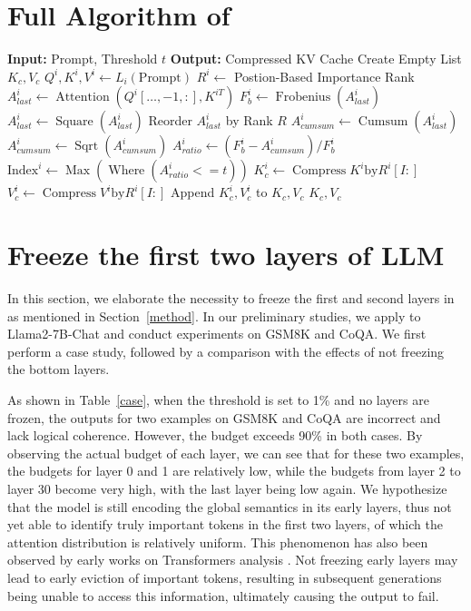 \section{Full Algorithm of \method}

\begin{algorithm}
\caption{\method \label{al}}
\begin{algorithmic}
    \STATE \textbf{Input:} Prompt, Threshold $t$
    \STATE \textbf{Output:} Compressed KV Cache
    \STATE Create Empty List $K_c,V_c$
        \STATE $Q^i,K^i,V^i \leftarrow L_i(\text{Prompt})$
        \STATE $R^i \gets$ Postion-Based Importance Rank
        \STATE $A_{last}^i\gets \operatorname{Attention}(Q^i[\dots,-1,:], K^{iT})$
        \STATE $F_{b}^i \gets \operatorname{Frobenius}(A_{last}^i)$
        \STATE $A_{last}^i\gets \operatorname{Square}(A_{last}^i)$
        \STATE Reorder $A_{last}^i$ by Rank $R$
        \STATE $A_{cumsum}^i \gets \operatorname{Cumsum}(A_{last}^i)$
        \STATE $A_{cumsum}^i \gets \operatorname{Sqrt}(A_{cumsum}^i)$
        \STATE $A_{ratio}^i \gets (F_b^i - A_{cumsum}^i)/F_b^i$
        \STATE $\text{Index}^i \gets \operatorname{Max}(\operatorname{Where}(A_{ratio}^i<=t))$
        \STATE $K_c^i \gets \operatorname{Compress} K^i \text{by} R^i[I:]$
        \STATE $V_c^i \gets \operatorname{Compress} V^i \text{by} R^i[I:]$ 
        \STATE Append $K_c^i,V_c^i$ to $K_c,V_c$
    \ENDFOR
    \RETURN $K_c,V_c$
\end{algorithmic}
\end{algorithm}

\section{Freeze the first two layers of LLM}
\label{app:freeze}

In this section, we elaborate the necessity to freeze the first and second layers in \method as mentioned in Section~\ref{method}. 
In our preliminary studies, we apply \method to Llama2-7B-Chat and conduct experiments on GSM8K and CoQA. We first perform a case study, followed by a comparison with the effects of not freezing the bottom layers.

As shown in Table~\ref{case}, when the threshold is set to 1\% and no layers are frozen, the outputs for two examples on GSM8K and CoQA are incorrect and lack logical coherence. However, the budget exceeds 90\% in both cases. By observing the actual budget of each layer, we can see that for these two examples, the budgets for layer 0 and 1 are relatively low, while the budgets from layer 2 to layer 30 become very high, with the last layer being low again. We hypothesize that the model is still encoding the global semantics in its early layers, thus not yet able to identify truly important tokens in the first two layers, of which the attention distribution is relatively uniform.
This phenomenon has also been observed by early works on Transformers analysis \cite{ethayarajh-2019-contextual,gari-soler-apidianaki-2021-lets}.
Not freezing early layers may lead to early eviction of important tokens, resulting in subsequent generations being unable to access this information, ultimately causing the output to fail.

